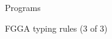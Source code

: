 \begin{figure}
    Programs  \hfill {}
    \begin{mathpar}
    \end{mathpar}

    \caption{FGGA typing rules (3 of 3)}
\end{figure}
